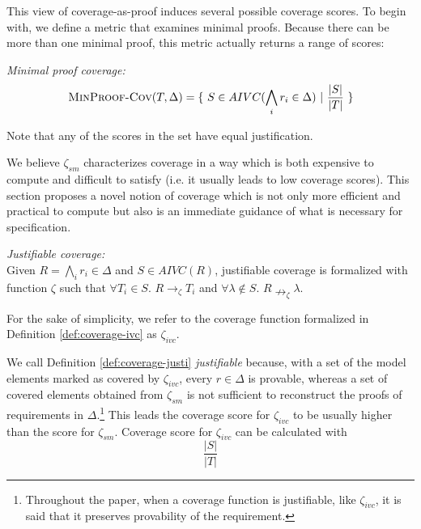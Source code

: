 \vspace{0.2in}

This view of coverage-as-proof induces several possible coverage scores.  To begin with, we define a metric that examines minimal proofs.  Because
there can be more than one minimal proof, this metric actually returns a range of scores:
\begin{definition} {\emph{Minimal proof coverage:}} \\
  \label{def:coverage-ivc}
\[
   \text{\sc MinProof-Cov}(T, \Delta) = \{~S \in AIVC(\bigwedge_{i} {r_i \in \Delta})~|~\frac{ |S|}{|T|}~\}
\]
\end{definition}

\noindent Note that any of the scores in the set have equal justification.

%

We believe $\zeta_{sm}$ characterizes coverage in a way which is both expensive to compute and difficult to satisfy (i.e. it usually leads to low coverage scores). This section proposes a novel notion of coverage which is not only more efficient and practical to compute but also is an immediate guidance of what is necessary for specification.

\begin{definition} {\emph{Justifiable coverage:}} \\
  \label{def:coverage-justi}
Given $R = \bigwedge_{i} {r_i \in \Delta}$ and $S \in AIVC(R)$, justifiable coverage is formalized with function $\zeta$ such that  $\forall T_i \in S$. $R \rightarrow_\zeta T_i$
  and $\forall \lambda \notin S$. $R \nrightarrow_{\zeta} \lambda$.
\end{definition}
\vspace{2mm}

For the sake of simplicity, we refer to the coverage function
formalized in Definition \ref{def:coverage-ivc} as $\zeta_{ivc}$.

We call Definition \ref{def:coverage-justi} \emph{justifiable} because, with a set of the model elements marked as covered by $\zeta_{ivc}$, every $r \in \Delta$ is provable, whereas a set of covered elements obtained from $\zeta_{sm}$ is not sufficient to reconstruct the proofs of requirements in $\Delta$.\footnote{Throughout the paper, when a coverage function is justifiable, like $\zeta_{ivc}$, it is said that it preserves provability of the requirement.}
This leads the coverage score for $\zeta_{ivc}$ to be usually higher than the score for $\zeta_{sm}$. Coverage score for $\zeta_{ivc}$ can be calculated with $$\frac{|S|}{|T|}$$

